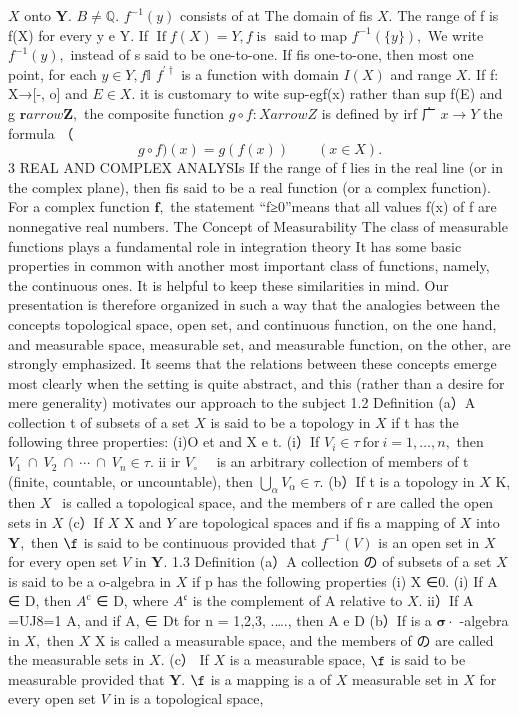 $\textstyle X$ onto ${\boldsymbol{Y}}.$ $B\neq\mathbb{Q}.$ $f^{-1}(y)$ consists of at The domain of fis $X.$ The range of f is f(X) for every y e Y. If $\operatorname{If}f(X)=Y,f\operatorname{is}$ said to map $f^{-1}(\{y\}),$ We write $f^{-1}(y),$ instead of s said to be one-to-one. If fis one-to-one, then most one point, for each $y\in Y,f\mathbb{I}$ $f^{\prime\dagger}$ is a function with domain $\scriptstyle I(X)$ and range $X.$ If f: X→[-, o] and $E\in X.$ it is customary to wite sup-egf(x) rather than sup f(E) and g $\mathbf{r} arrow\mathbf{Z},$ the composite function $g\circ f\colon X arrow Z$ is defined by irf 广 $x{\xrightarrow{}}Y$ the formula （ $$ g\circ f)(x)=g(f(x))\qquad(x\in X). $$3 REAL AND COMPLEX ANALYSIs If the range of f lies in the real line (or in the complex plane), then fis said to be a real function (or a complex function). For a complex function ${\boldsymbol{f}},$ the statement “f≥0”means that all values f(x) of f are nonnegative real numbers. The Concept of Measurability The class of measurable functions plays a fundamental role in integration theory It has some basic properties in common with another most important class of functions, namely, the continuous ones. It is helpful to keep these similarities in mind. Our presentation is therefore organized in such a way that the analogies between the concepts topological space, open set, and continuous function, on the one hand, and measurable space, measurable set, and measurable function, on the other, are strongly emphasized. It seems that the relations between these concepts emerge most clearly when the setting is quite abstract, and this (rather than a desire for mere generality) motivates our approach to the subject 1.2 Definition (a）A collection t of subsets of a set $\textstyle X$ is said to be a topology in $X$ if t has the following three properties: (i)O et and X e t. (i）If $V_{i}\in\tau\mathrm{~for~}i=1,\ldots,n,$ then $V_{1}\ \cap\ V_{2}\ \cap\ \cdots\ \cap\ V_{n}\in\tau.$ ii ir $\scriptstyle V_{\circ}\quad$ is an arbitrary collection of members of t (finite, countable, or uncountable), then $\bigcup_{\alpha}V_{\alpha}\in\tau.$ (b）If t is a topology in $X$ K, then $\textstyle X{\ ~}$ is called a topological space, and the members of r are called the open sets in $\textstyle X$ (c）If $X$ X and ${\mathbf{}}Y$ are topological spaces and if fis a mapping of $X$ into ${\boldsymbol{Y}},$ then $\boldsymbol{\f}$ is said to be continuous provided that $f^{-1}(V)$ is an open set in $X$ for every open set ${\mathbf{}}V$ in ${\boldsymbol{Y}}.$ 1.3 Definition (a）A collection の of subsets of a set $X$ is said to be a o-algebra in $\textstyle X$ if p has the following properties (i) X ∈0. (i) If A ∈ D, then $A^{\mathrm{c}}$ ∈ D, where $A^{\mathfrak{c}}$ is the complement of A relative to $X.$ ii）If A =UJ8=1 A, and if A, ∈ Dt for n = 1,2,3, .…., then A e D (b）If is a ${\boldsymbol{\sigma}}\cdot$ -algebra in $X,$ then $X$ X is called a measurable space, and the members of の are called the measurable sets in $X.$ (c） If $X$ is a measurable space, $\boldsymbol{\f}$ is said to be measurable provided that ${\boldsymbol{Y}}.$ $\boldsymbol{\f}$ is a mapping is a of $X$ measurable set in $X$ for every open set ${\mathbf{}}V$ in is a topological space, 